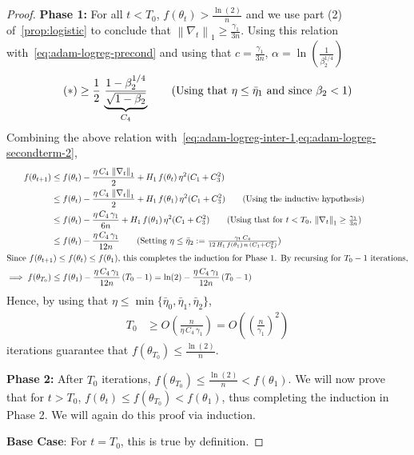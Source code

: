 \documentclass{article}
\newcommand{\norm}[1]{\left\|#1 \right\|}
\newcommand{\tht}{\theta_t}
\newcommand{\thtt}{\theta_{t+1}}
\begin{document}
\begin{proof}
\textbf{Phase 1:} For all $t < T_0$, $f(\tht) > \frac{\ln(2)}{n}$ and we use part (2) of~\cref{prop:logistic} to conclude that $\norm{\nabla_t}_1 \geq \frac{\gamma_1}{3n}$. Using this relation with~\cref{eq:adam-logreg-precond} and using that $c = \frac{\gamma_1}{3n}$, $\alpha = \ln(\frac{1}{\beta_2^{1/4}})$
\begin{align*}
(*) \geq \frac{1}{2} \, \underbrace{\frac{1 - \beta_2^{1/4}}{\sqrt{1- \beta_2}}}_{C_4}  \tag{Using that $\eta \leq \bar{\eta}_1$ and since $\beta_2 < 1$}    
\end{align*}
Combining the above relation with~\cref{eq:adam-logreg-inter-1,eq:adam-logreg-secondterm-2},
\begin{align*}
f(\thtt) & \leq f(\tht) - \frac{\eta \,C_4\, \norm{\nabla_t}_1}{2} + H_1 \, f(\tht) \, \eta^2(C_1+C^2_3) \\
& \leq  f(\tht) - \frac{\eta \,C_4\, \norm{\nabla_t}_1}{2} + H_1 \, f(\theta_1) \, \eta^2(C_1+C^2_3) \tag{Using the inductive hypothesis} \\
& \leq f(\tht) - \frac{\eta\,C_4 \, \gamma_1}{6n} + H_1 \, f(\theta_1) \, \eta^2(C_1+C^2_3) \tag{Using that for $t < T_0$, $\norm{\nabla_t}_1 \geq \frac{\gamma_1}{3n}$} \\
& \leq f(\tht) - \frac{\eta \,C_4\, \gamma_1}{12n} \tag{Setting $\eta \leq \bar{\eta}_2 := \frac{ \gamma_1\,C_4}{12 \, H_1 \, f(\theta_1) \, n \, (C_1+C^2_3)}$} \\
\intertext{Since $f(\thtt) \leq f(\tht) \leq f(\theta_1)$, this completes the induction for Phase 1. By recursing for $T_0-1$ iterations,}
\implies f(\theta_{T_0}) & \leq f(\theta_1) -  \frac{\eta\,C_4 \, \gamma_1}{12n} \, (T_0-1) = \ln(2) -  \frac{\eta\,C_4 \, \gamma_1}{12n} \, (T_0-1)
\end{align*}
Hence, by using that $\eta \leq \min\{\bar{\eta}_0, \bar{\eta}_1 , \bar{\eta}_2\}$,
\begin{align*}
T_0 & \geq O \left(\frac{n}{\eta \,C_4\, \gamma_1} \right) = O \left( \left(\frac{n}{\gamma_1}\right)^2   \right)
\end{align*}
iterations guarantee that $f(\theta_{T_0}) \leq \frac{\ln(2)}{n}$. 



\textbf{Phase 2:} After $T_0$ iterations, $f(\theta_{T_0}) \leq \frac{\ln(2)}{n} < f(\theta_1)$. We will now prove that for $t > T_0$, $f(\tht) \leq f(\theta_{T_0}) < f(\theta_1)$, thus completing the induction in Phase 2. We will again do this proof via induction. 

\textbf{Base Case}: For $t = T_0$, this is true by definition. 


\end{proof}
\end{document}
